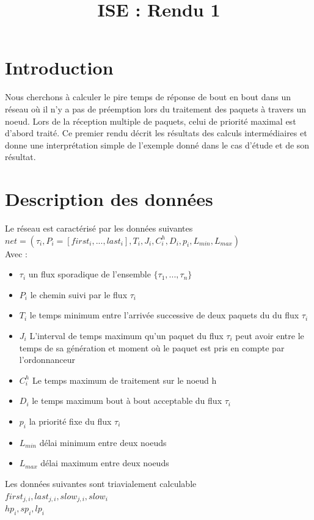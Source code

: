 \documentclass[10pt,a4paper]{article}
\title{ISE : Rendu 1}
\begin{document}
\maketitle

\section{Introduction}
Nous cherchons à calculer le pire temps de réponse de bout en bout dans un réseau où il n'y a pas de préemption lors du traitement des paquets à travers un noeud. Lors de la réception multiple de paquets, celui de priorité maximal est d'abord traité. Ce premier rendu décrit les résultats des calculs intermédiaires et donne une interprétation simple de l'exemple donné dans le cas d'étude et de son résultat.

\section{Description des données}
Le réseau est caractérisé par les données suivantes\\
$net=(\tau_i, P_i = [first_i,...,last_i], T_i, J_i, C_i^h, D_i, p_i, L_{min}, L_{max})$\\
Avec : 
\begin{itemize}
\item $\tau_i$ un flux sporadique de l'ensemble $\{\tau_1, ..., \tau_n\}$
\item $P_i$ le chemin suivi par le flux $\tau_i$
\item $T_i$ le temps minimum entre l'arrivée successive de deux paquets du du flux $\tau_i$
\item $J_i$ L'interval de temps maximum qu'un paquet du flux $\tau_i$ peut avoir entre le temps de sa génération et moment où le paquet est pris en compte par l'ordonnanceur
\item $C_i^h$ Le temps maximum de traitement sur le noeud h
\item $D_i$ le temps maximum bout à bout acceptable du flux $\tau_i$
\item $p_i$ la priorité fixe du flux $\tau_i$
\item $L_{min}$ délai minimum entre deux noeuds
\item $L_{max}$ délai maximum entre deux noeuds

\end{itemize}

Les données suivantes sont triavialement calculable\\
$first_{j,i}, last_{j,i}, slow_{j,i}, slow_i$\\
$hp_i, sp_i, lp_i$\\
\end{document}
